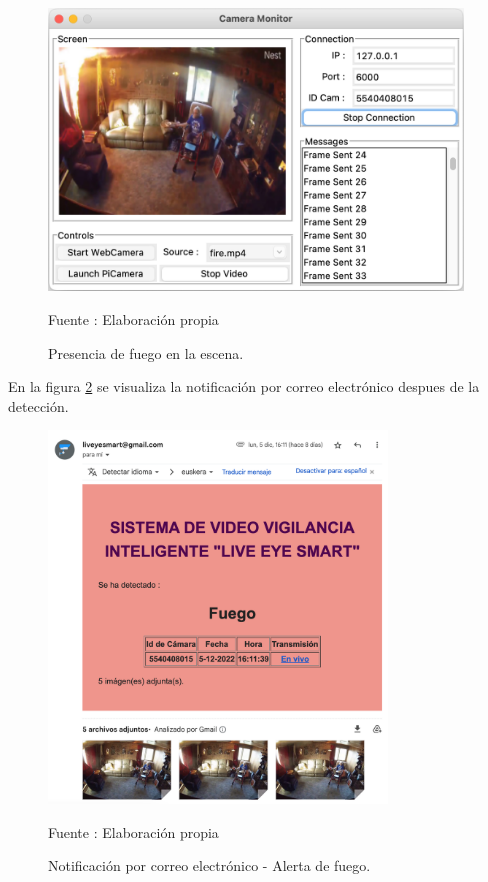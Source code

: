 \begin{figure}[H]
    \begin{center}
        \includegraphics[width=11cm]{img/capitulo_6/fire.png}
    \end{center}
    \begin{center}
        \caption{Presencia de fuego en la escena.}
        Fuente : Elaboración propia
        \label{camera_fire_detector}
    \end{center}
\end{figure}

En la figura \ref{mail_fire_detection} se visualiza la notificación por correo electrónico despues de la detección.

\begin{figure}[H]
    \begin{center}
        \includegraphics[width=9cm]{img/capitulo_6/mail_fire.png}
    \end{center}
    \begin{center}
        \caption{Notificación por correo electrónico - Alerta de fuego.}
        Fuente : Elaboración propia
        \label{mail_fire_detection}
    \end{center}
\end{figure}

